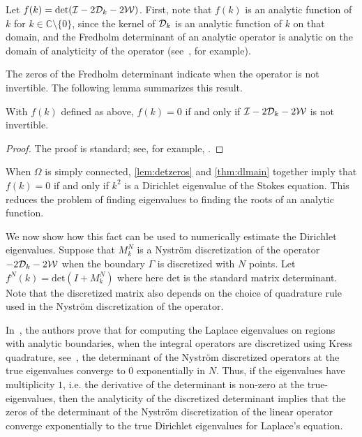 Let $f(k) = \text{det}(\mathcal I - 2{\mathcal D}_{k} - 2{\mathcal W})$.
First, note that $f(k)$ is an analytic function of $k$
for $k \in \mathbb{C} \setminus \{0 \}$, since the kernel
of ${\mathcal D}_{k}$ is an analytic function of $k$ on that domain, 
and the Fredholm determinant of an analytic operator 
is analytic on the domain of analyticity
of the operator (see~\cite{zhao2015robust}, for example).

The zeros of the Fredholm determinant indicate when the
operator is not invertible.
The following lemma summarizes this result.
\begin{lem} \label{lem:detzeros}
  With $f(k)$ defined as above, $f(k) = 0$ if and only if
  $\mathcal I - 2{\mathcal D}_{k} -2{\mathcal W}$ is not invertible.
\end{lem}
\begin{proof}
  The proof is standard; see, for example,
  \cite[p. 34]{simon2005trace}.
\end{proof}

When $\Omega$ is simply connected, \cref{lem:detzeros} and 
\cref{thm:dlmain} together imply that $f(k) = 0$
if and only if $k^2$ 
is a Dirichlet eigenvalue of the Stokes equation.
This reduces the problem of finding eigenvalues to
finding the roots of an analytic function.

We now show how this fact can be used to numerically
estimate the Dirichlet eigenvalues.
Suppose that $M_{k}^{N}$ is a Nystr\"{o}m discretization 
of the operator $-2{\mathcal D}_{k} - 2{\mathcal W}$ when the boundary 
$\Gamma$ is discretized with $N$ points. 
Let $f^{N}(k) = \text{det}(I + M_{k}^{N})$
where here $\text{det}$ is the standard matrix determinant.
Note that the discretized matrix also depends on the choice
of quadrature rule used in the Nystr\"{o}m discretization
of the operator.

In~\cite{zhao2015robust}, the authors prove that
for computing the Laplace eigenvalues on regions with 
analytic boundaries, when the integral operators are
discretized using Kress quadrature, see~\cite{kress1991boundary},
the determinant of the Nystr\"{o}m discretized operators
at the true eigenvalues converge to $0$ exponentially
in $N$.
Thus, if the eigenvalues have multiplicity $1$,
i.e. the derivative of the determinant is non-zero
at the true-eigenvalues, then the analyticity of the
discretized determinant implies that the zeros
of the determinant of the Nystr\"{o}m discretization
of the linear operator converge exponentially to
the true Dirichlet eigenvalues for Laplace's equation.

